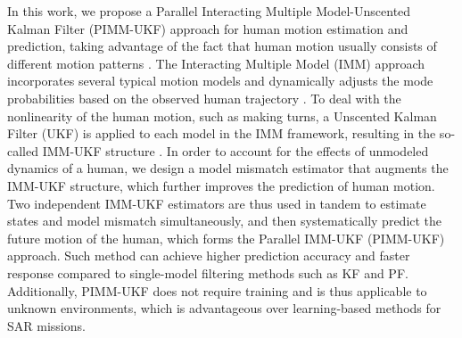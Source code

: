 \documentclass[journal]{IEEEtran}
\newcommand{\todohere}[1]{\hl{(\textbf{TODO:} #1)}}
\DeclareRobustCommand{\clnote}[1]{\ifthenelse{\boolean{include-notes}}%
{\textcolor{orange}{\textbf{CL: #1}}}{}}
\DeclareRobustCommand{\dhnote}[1]{\ifthenelse{\boolean{include-notes}}%
{\textcolor{blue}{\textbf{DH: #1}}}{}}
\DeclareRobustCommand{\grnote}[1]{\ifthenelse{\boolean{include-notes}}%
{\textcolor{purple}{\textbf{GR: #1}}}{}}
\begin{document}
In this work, we propose a Parallel Interacting Multiple Model-Unscented Kalman Filter (PIMM-UKF) approach for human motion estimation and prediction, taking advantage of the fact that human motion usually consists of different motion patterns \cite{aggarwal1999human}. %
	The Interacting Multiple Model (IMM) approach incorporates several typical motion models and dynamically adjusts the mode probabilities based on the observed human trajectory \cite{yaakov2001estimation}.
	To deal with the nonlinearity of the human motion, such as making turns, a Unscented Kalman Filter (UKF) is applied to each model in the IMM framework, resulting in the so-called IMM-UKF structure \cite{lee2015interacting}.
In order to account for the effects of unmodeled dynamics of a human, we design a model mismatch estimator that augments the IMM-UKF structure, which further improves the prediction of human motion. 
Two independent IMM-UKF estimators are thus 
used in tandem
to estimate states and model mismatch simultaneously, and then systematically predict the future motion of the human, which forms the Parallel IMM-UKF (PIMM-UKF) approach.
Such method can achieve higher prediction accuracy and faster response compared to single-model filtering methods such as KF and PF. 
	Additionally, PIMM-UKF does not require training and is thus applicable to unknown environments, which is advantageous over learning-based methods for SAR missions.
    
\end{document}
